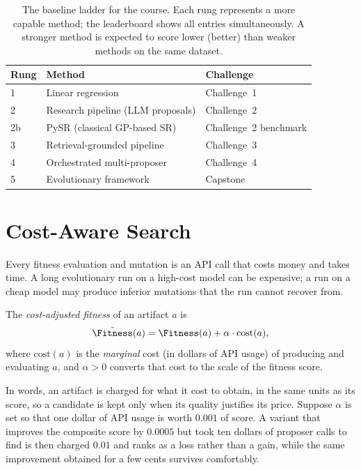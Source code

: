 \begin{table}[htb!]
\begin{center}
\begin{tabular}{lll}
\toprule
\textbf{Rung} & \textbf{Method} & \textbf{Challenge} \\
\midrule
1 & Linear regression & Challenge~1 \\
2 & Research pipeline (LLM proposals) & Challenge~2 \\
2b & PySR (classical GP-based SR) & Challenge~2 benchmark \\
3 & Retrieval-grounded pipeline & Challenge~3 \\
4 & Orchestrated multi-proposer & Challenge~4 \\
5 & Evolutionary framework & Capstone \\
\bottomrule
\end{tabular}
\caption{The baseline ladder for the course.
Each rung represents a more capable method; the leaderboard shows all entries simultaneously.
A stronger method is expected to score lower (better) than weaker methods on the same dataset.}
\label{table:BaselineLadder}
\end{center}
\end{table}

\section{Cost-Aware Search}
\label{section:CostAwareSearch}

Every fitness evaluation and mutation is an API call that costs money and takes time.
A long evolutionary run on a high-cost model can be expensive; a run on a cheap model may produce inferior mutations that the run cannot recover from.

\begin{definition}
The \emph{cost-adjusted fitness} of an artifact $a$ is
\begin{equation}
\tilde{\Fitness}(a) = \Fitness(a) + \alpha \cdot \mathrm{cost}(a) ,
\label{equation:CostAdjustedFitness}
\end{equation}
where $\mathrm{cost}(a)$ is the \emph{marginal} cost (in dollars of API usage) of producing and evaluating $a$, and $\alpha > 0$ converts that cost to the scale of the fitness score.
\end{definition}

In words, an artifact is charged for what it cost to obtain, in the same units as its score, so a candidate is kept only when its quality justifies its price.
Suppose $\alpha$ is set so that one dollar of API usage is worth $0.001$ of score.
A variant that improves the composite score by $0.0005$ but took ten dollars of proposer calls to find is then charged $0.01$ and ranks as a loss rather than a gain, while the same improvement obtained for a few cents survives comfortably.

